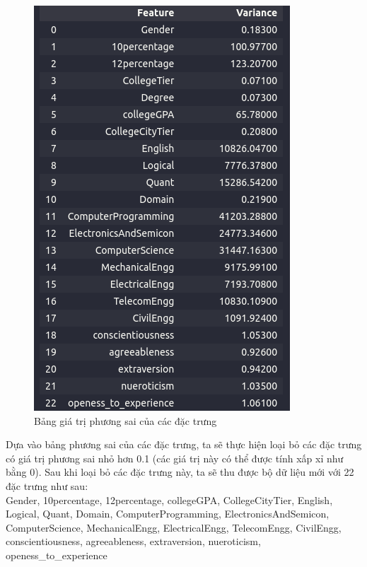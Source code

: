 \documentclass{report}
\begin{document}
    \begin{figure}[H]
        \includegraphics[width=\textwidth, height=0.5\textheight, keepaspectratio]{assets/variance.png}
        \centering
        \caption{Bảng giá trị phương sai của các đặc trưng}
    \end{figure}
    
    Dựa vào bảng phương sai của các đặc trưng, ta sẽ thực hiện loại bỏ các đặc trưng có giá trị phương sai nhỏ hơn 0.1 (các giá trị này có thể được tính xấp xỉ như bằng 0). Sau khi loại bỏ các đặc trưng này, ta sẽ thu được bộ dữ liệu mới với 22 đặc trưng như sau:\\
    Gender, 10percentage, 12percentage, collegeGPA, CollegeCityTier, English, Logical, Quant, Domain, ComputerProgramming, ElectronicsAndSemicon, ComputerScience, MechanicalEngg, ElectricalEngg, TelecomEngg, CivilEngg, conscientiousness, agreeableness, extraversion, nueroticism, openess\_to\_experience
    
\end{document}
